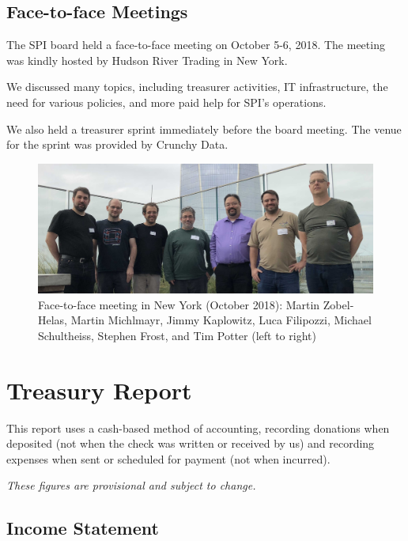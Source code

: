 \documentclass[a4paper]{report}
\begin{document}
\section{Face-to-face Meetings}

The SPI board held a face-to-face meeting on October 5-6, 2018.
The meeting was kindly hosted by Hudson River Trading in New York.

We discussed many topics, including treasurer activities, IT
infrastructure, the need for various policies, and more paid help for
SPI's operations.

We also held a treasurer sprint immediately before the board meeting.
The venue for the sprint was provided by Crunchy Data.

\begin{figure}[h]
\centering

\includegraphics[scale=0.14]{images/2018-october-f2f}

\caption{Face-to-face meeting in New York (October 2018): Martin
Zobel-Helas, Martin Michlmayr, Jimmy Kaplowitz, Luca Filipozzi, Michael
Schultheiss, Stephen Frost, and Tim Potter (left to right)}

\end{figure}

\chapter{Treasury Report}

This report uses a cash-based method of accounting, recording donations
when deposited (not when the check was written or received by us) and
recording expenses when sent or scheduled for payment (not when
incurred).

{\em These figures are provisional and subject to change.}

\section{Income Statement}
\end{document}
